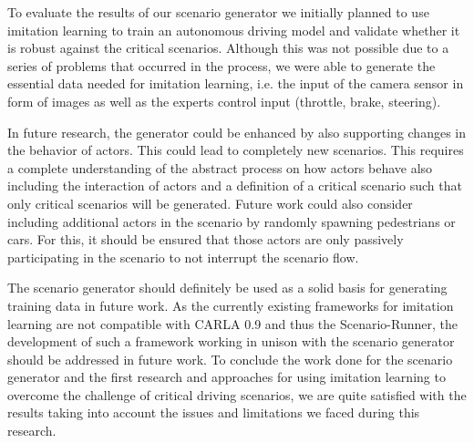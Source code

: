 \documentclass[conference, a4paper, 11pt]{IEEEtran}
\begin{document}
	To evaluate the results of our scenario generator we initially planned to use imitation learning to train an autonomous driving model and validate whether it is robust against the critical scenarios. Although this was not possible due to a series of problems that occurred in the process, we were able to generate the essential data needed for imitation learning, i.e. the input of the camera sensor in form of images as well as the experts control input (throttle, brake, steering).
	
	In future research, the generator could be enhanced by also supporting changes in the behavior of actors. This could lead to completely new scenarios. This requires a complete understanding of the abstract process on how actors behave also including the interaction of actors and a definition of a critical scenario such that only critical scenarios will be generated.
	Future work could also consider including additional actors in the scenario by randomly spawning pedestrians or cars. For this, it should be ensured that those actors are only passively participating in the scenario to not interrupt the scenario flow.
	
	The scenario generator should definitely be used as a solid basis for generating training data in future work. As the currently existing frameworks for imitation learning are not compatible with CARLA 0.9 and thus the Scenario-Runner, the development of such a framework working in unison with the scenario generator should be addressed in future work.
	To conclude the work done for the scenario generator and the first research and approaches for using imitation learning to overcome the challenge of critical driving scenarios, we are quite satisfied with the results taking into account the issues and limitations we faced during this research.
	
	\printbibliography
	
	\newpage
	\onecolumn
	\appendix\
	\label{appendix}
	
\end{document}
